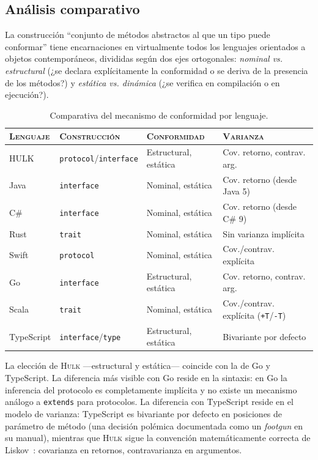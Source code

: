 \documentclass[11pt,a4paper,oneside,openany]{report}
\newcommand{\hulk}{\textsc{Hulk}}
\newcommand{\code}[1]{\texttt{#1}}
\begin{document}
\subsection{Análisis comparativo}

La construcción ``conjunto de métodos abstractos al que un tipo puede
conformar'' tiene encarnaciones en virtualmente todos los lenguajes
orientados a objetos contemporáneos, divididas según dos ejes ortogonales:
\emph{nominal vs. estructural} (¿se declara explícitamente la conformidad o
se deriva de la presencia de los métodos?) y \emph{estática vs. dinámica}
(¿se verifica en compilación o en ejecución?).

\begin{table}[H]
\centering
\caption{Comparativa del mecanismo de conformidad por lenguaje.}
\label{tab:proto-lang}
\begin{tabularx}{\textwidth}{lXXX}
\toprule
\textsc{Lenguaje} & \textsc{Construcción} & \textsc{Conformidad} & \textsc{Varianza} \\
\midrule
HULK    & \code{protocol}/\code{interface}  & Estructural, estática  & Cov. retorno, contrav. arg. \\
Java    & \code{interface}                  & Nominal, estática     & Cov. retorno (desde Java 5) \\
C\#     & \code{interface}                  & Nominal, estática     & Cov. retorno (desde C\# 9) \\
Rust    & \code{trait}                       & Nominal, estática     & Sin varianza implícita \\
Swift   & \code{protocol}                    & Nominal, estática     & Cov./contrav. explícita \\
Go      & \code{interface}                  & Estructural, estática  & Cov. retorno, contrav. arg. \\
Scala   & \code{trait}                       & Nominal, estática     & Cov./contrav. explícita (\code{+T}/\code{-T}) \\
TypeScript & \code{interface}/\code{type}   & Estructural, estática  & Bivariante por defecto \\
\bottomrule
\end{tabularx}
\end{table}

La elección de \hulk{} ---estructural y estática--- coincide con la de Go y
TypeScript. La diferencia más visible con Go reside en la sintaxis: en Go la
inferencia del protocolo es completamente implícita y no existe un
mecanismo análogo a \code{extends} para protocolos. La diferencia con
TypeScript reside en el modelo de varianza: TypeScript es bivariante por
defecto en posiciones de parámetro de método (una decisión polémica
documentada como un \emph{footgun} en su manual), mientras que \hulk{}
sigue la convención matemáticamente correcta de Liskov~\cite{liskov1994}:
covarianza en retornos, contravarianza en argumentos.
\end{document}
